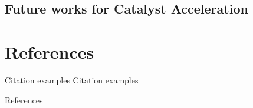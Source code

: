 \documentclass[11pt]{beamer}
\theoremstyle{definition}
\begin{document}
    \subsection{Future works for Catalyst Acceleration}
        

\section{References}
    \begin{frame}{Citation examples}
        Citation examples \cite{chambolle_convergence_2015}
    \end{frame}

    \begin{frame}[allowframebreaks]{References}
        
    \end{frame}
\end{document}
